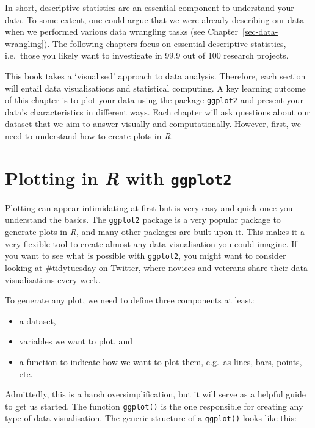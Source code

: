 \documentclass[
  letterpaper,
  DIV=11,
  numbers=noendperiod]{scrreprt}
\begin{document}
In short, descriptive statistics are an essential component to
understand your data. To some extent, one could argue that we were
already describing our data when we performed various data wrangling
tasks (see Chapter~\ref{sec-data-wrangling}). The following chapters
focus on essential descriptive statistics, i.e.~those you likely want to
investigate in 99.9 out of 100 research projects.

This book takes a `visualised' approach to data analysis. Therefore,
each section will entail data visualisations and statistical computing.
A key learning outcome of this chapter is to plot your data using the
package \texttt{ggplot2} and present your data's characteristics in
different ways. Each chapter will ask questions about our dataset that
we aim to answer visually and computationally. However, first, we need
to understand how to create plots in \emph{R}.

\section{\texorpdfstring{Plotting in \emph{R} with
\texttt{ggplot2}}{Plotting in R with ggplot2}}\label{sec-plotting-in-r-with-ggplot2}

Plotting can appear intimidating at first but is very easy and quick
once you understand the basics. The \texttt{ggplot2} package is a very
popular package to generate plots in \emph{R}, and many other packages
are built upon it. This makes it a very flexible tool to create almost
any data visualisation you could imagine. If you want to see what is
possible with \texttt{ggplot2}, you might want to consider looking at
\href{https://twitter.com/search?q=\%23tidytuesday}{\#tidytuesday} on
Twitter, where novices and veterans share their data visualisations
every week.

To generate any plot, we need to define three components at least:

\begin{itemize}
\item
  a dataset,
\item
  variables we want to plot, and
\item
  a function to indicate how we want to plot them, e.g.~as lines, bars,
  points, etc.
\end{itemize}

Admittedly, this is a harsh oversimplification, but it will serve as a
helpful guide to get us started. The function \texttt{ggplot()} is the
one responsible for creating any type of data visualisation. The generic
structure of a \texttt{ggplot()} looks like this:
\end{document}
